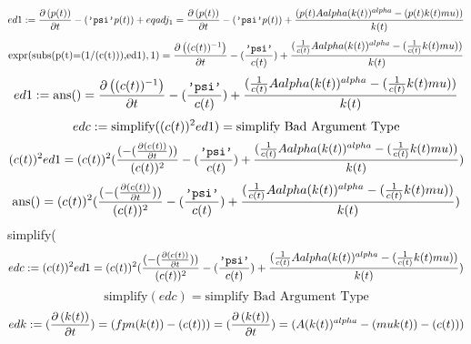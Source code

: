 \documentclass{article}
\begin{document}
\begin{equation} \label{eq:16}
ed1:=\frac{\partial \left(p(t)\right)}{\partial t}-(\mbox{\tt'psi'}\* p(t))+eqadj_1 = \frac{\partial \left(p(t)\right)}{\partial t}-(\mbox{\tt'psi'}\* p(t))+\frac{(p(t)\* A\* alpha\* (k(t))^{alpha}-(p(t)\* k(t)\* mu))}{k(t)}
\end{equation}
\begin{equation} \label{eq:17}
\mbox{expr}(\mbox{subs(p(t)=(1/(c(t))),ed1)},1) = \frac{\partial \left((c(t))^{-1}\right)}{\partial t}-(\frac{\mbox{\tt'psi'}}{c(t)})+\frac{(\frac{1}{c(t)} \* A\* alpha\* (k(t))^{alpha}-(\frac{1}{c(t)} \* k(t)\* mu))}{k(t)}
\end{equation}
\begin{equation} \label{eq:18}
ed1:=\mbox{ans()} = \frac{\partial \left((c(t))^{-1}\right)}{\partial t}-(\frac{\mbox{\tt'psi'}}{c(t)})+\frac{(\frac{1}{c(t)} \* A\* alpha\* (k(t))^{alpha}-(\frac{1}{c(t)} \* k(t)\* mu))}{k(t)}
\end{equation}
\begin{equation} \label{eq:19}
edc:=\mbox{simplify}((c(t))^{2}\* ed1) = \mbox{simplify Bad Argument Type}
\end{equation}
\begin{equation} \label{eq:20}
(c(t))^{2}\* ed1 = (c(t))^{2}\* (\frac{(-(\frac{\partial \left(c(t)\right)}{\partial t}))}{(c(t))^{2}}-(\frac{\mbox{\tt'psi'}}{c(t)})+\frac{(\frac{1}{c(t)} \* A\* alpha\* (k(t))^{alpha}-(\frac{1}{c(t)} \* k(t)\* mu))}{k(t)})
\end{equation}
\begin{equation} \label{eq:21}
\mbox{ans()} = (c(t))^{2}\* (\frac{(-(\frac{\partial \left(c(t)\right)}{\partial t}))}{(c(t))^{2}}-(\frac{\mbox{\tt'psi'}}{c(t)})+\frac{(\frac{1}{c(t)} \* A\* alpha\* (k(t))^{alpha}-(\frac{1}{c(t)} \* k(t)\* mu))}{k(t)})
\end{equation}
simplify(%
\begin{equation} \label{eq:23}
edc:=(c(t))^{2}\* ed1 = (c(t))^{2}\* (\frac{(-(\frac{\partial \left(c(t)\right)}{\partial t}))}{(c(t))^{2}}-(\frac{\mbox{\tt'psi'}}{c(t)})+\frac{(\frac{1}{c(t)} \* A\* alpha\* (k(t))^{alpha}-(\frac{1}{c(t)} \* k(t)\* mu))}{k(t)})
\end{equation}
\begin{equation} \label{eq:24}
\mbox{simplify}(edc) = \mbox{simplify Bad Argument Type}
\end{equation}
\begin{equation} \label{eq:25}
edk:=(\frac{\partial \left(k(t)\right)}{\partial t})=(fpn(k(t))-(c(t))) = (\frac{\partial \left(k(t)\right)}{\partial t})=(A\* (k(t))^{alpha}-(mu\* k(t))-(c(t)))
\end{equation}
\end{document}
